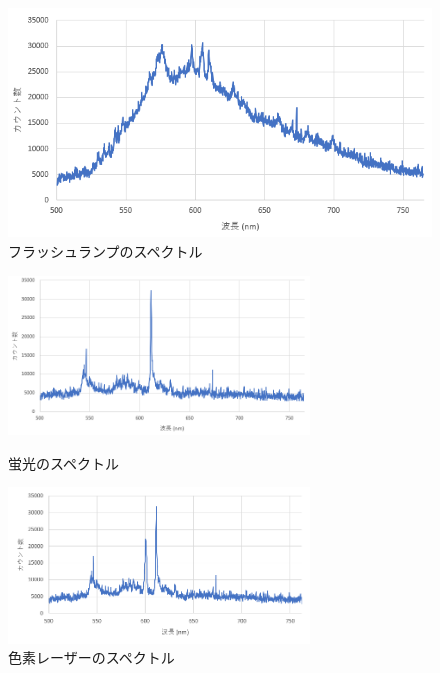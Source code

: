 \documentclass[uplatex,dvipdfmx,a4paper,11pt]{jlreq}
\numberwithin{equation}{section}
\theoremstyle{definition}
\begin{document}
\begin{figure}[htbp]
  \centering
  \includegraphics[width=14cm]{./assets/flush_lamp_true.png}
  \caption{フラッシュランプのスペクトル}
  \label{flush lamp}
\end{figure}
\begin{figure}[htbp]
  \begin{minipage}[b]{0.5\linewidth}
    \centering
    \includegraphics[width=8cm]{./assets/fluorescence.png}
    \caption{蛍光のスペクトル}
    \label{fluorescene}
  \end{minipage}
  \begin{minipage}[b]{0.5\linewidth}
    \centering
    \includegraphics[width=8cm]{./assets/dye_laser.png}
    \caption{色素レーザーのスペクトル}
    \label{dye laser}
  \end{minipage}
\end{figure}
\end{document}
